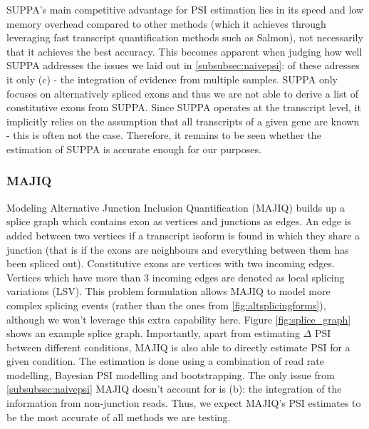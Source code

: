 SUPPA's main competitive advantage for PSI estimation lies in its speed and low memory overhead compared to other methods \cite{suppa} (which it achieves through leveraging fast transcript quantification methods such as Salmon), not necessarily that it achieves the best accuracy. This becomes apparent when judging how well SUPPA addresses the issues we laid out in \ref{subsubsec:naivepsi}: of these adresses it only (c) - the integration of evidence from multiple samples. SUPPA only focuses on alternatively spliced exons and thus we are not able to derive a list of constitutive exons from SUPPA. Since SUPPA operates at the transcript level, it implicitly relies on the assumption that all transcripts of a given gene are known - this is often not the case. Therefore, it remains to be seen whether the estimation of SUPPA is accurate enough for our purposes.





\subsubsection{MAJIQ}\label{subsubsec:majiq}
Modeling Alternative Junction Inclusion Quantification (MAJIQ) builds up a splice graph \cite{majiq2} which contains exon as vertices and junctions as edges. An edge is added between two vertices if a transcript isoform is found in which they share a junction (that is if the exons are neighbours and everything between them has been spliced out).
Constitutive exons are vertices with two incoming edges.
Vertices which have more than 3 incoming edges are denoted as local splicing variations (LSV). This problem formulation allows MAJIQ to model more complex splicing events (rather than the ones from \ref{fig:altsplicingforms}), although we won't leverage this extra capability here. Figure \ref{fig:splice_graph} shows an example splice graph. Importantly, apart from estimating $\Delta$ PSI between different conditions, MAJIQ is also able to directly estimate PSI for a given condition. The estimation is done using a combination of read rate modelling, Bayesian PSI modelling and bootstrapping. The only issue from \ref{subsubsec:naivepsi} MAJIQ doesn't account for is (b): the integration of the information from non-junction reads. Thus, we expect MAJIQ's PSI estimates to be the most accurate of all methods we are testing.


